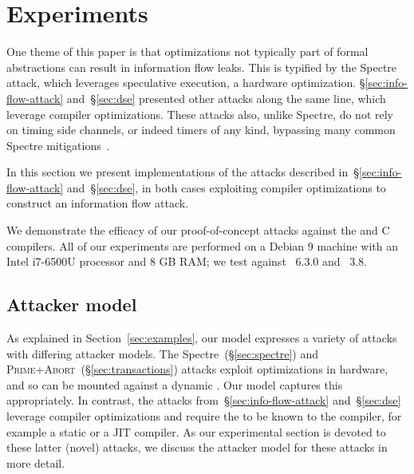\section{Experiments}
\label{sec:experiments}

One theme of this paper is that optimizations not typically part of formal
abstractions can result in information flow leaks.
This is typified by the Spectre attack, which leverages speculative execution,
a hardware optimization.
\S\ref{sec:info-flow-attack} and~\S\ref{sec:dse} presented other attacks
along the same line, which leverage compiler optimizations.
These attacks also, unlike Spectre, do not rely on timing side channels, or
indeed timers of any kind, bypassing many common Spectre
mitigations~\cite{KohlbrennerShacham2016, FirefoxPerformanceNow}.

In this section we present implementations of the attacks described
in~\S\ref{sec:info-flow-attack} and~\S\ref{sec:dse}, in both cases
exploiting compiler optimizations to construct an information flow attack.
We demonstrate the efficacy of our proof-of-concept attacks against
the {\CLANG} and {\GCC} C compilers.
All of our experiments are performed on a Debian 9 machine with an Intel
i7-6500U processor and 8 GB RAM;
we test against {\GCC}~6.3.0 and {\CLANG}~3.8.

\subsection{Attacker model}
\label{subsec:attacker-model}

As explained in Section~\ref{sec:examples}, our model expresses a variety
of attacks with differing attacker models.
The Spectre~(\S\ref{sec:spectre}) and
\textsc{Prime+Abort}~(\S\ref{sec:transactions}) attacks exploit optimizations
in hardware, and so can be mounted against a dynamic \SEC.
Our model captures this appropriately.
In contrast, the attacks from~\S\ref{sec:info-flow-attack}
and~\S\ref{sec:dse} leverage compiler optimizations and require the \SEC to
be known to the compiler, for example a static \SEC or a JIT compiler.
As our experimental section is devoted to these latter (novel) attacks, we
discuss the attacker model for these attacks in more detail.

